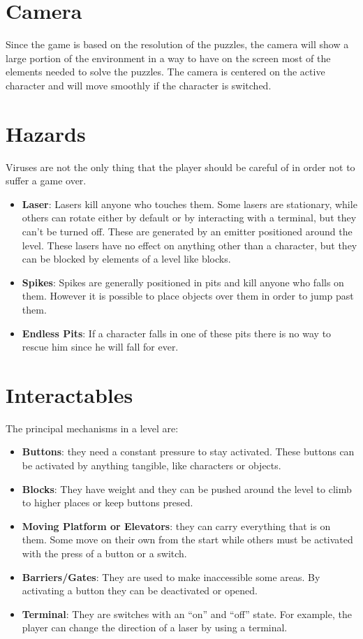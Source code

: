 \documentclass[12pt, a4paper]{report}
\begin{document}
\section*{Camera}

Since the game is based on the resolution of the puzzles, the camera will show a large portion of the environment in a way to have on the screen most of the elements needed to solve the puzzles. The camera is centered on the active character and will move smoothly if the character is switched.

\section*{Hazards}
Viruses are not the only thing that the player should be careful of in order not to suffer a game over.
\begin{itemize}
	\item \textbf{Laser}: Lasers kill anyone who touches them. Some lasers are stationary, while others can rotate either by default or by interacting with a 			terminal, but they can't be turned off. These are generated by an emitter positioned around the level. These lasers have no effect on anything other than a character, but they can be blocked by elements of a level like blocks.
	\item \textbf{Spikes}: Spikes are generally positioned in pits and kill anyone who falls on them. However it is possible to place objects over them in order to jump past them.
	\item \textbf{Endless Pits}: If a character falls in one of these pits there is no way to rescue him since he will fall for ever.
\end{itemize}

\section*{Interactables}
The principal mechanisms in a level are:
\begin{itemize}
	\item \textbf{Buttons}: they need a constant pressure to stay activated. These buttons can be activated by anything tangible, like characters or objects.
	\item \textbf{Blocks}: They have weight and they can be pushed around the level to climb to higher places or keep buttons presed.
	\item \textbf{Moving Platform or Elevators}: they can carry everything that is on them. Some move on their own from the start while others must be activated with the press of a button or a switch.
	\item \textbf{Barriers/Gates}: They are used to make inaccessible some areas. By activating a button they can be deactivated or opened.
	\item \textbf{Terminal}: They are switches with an “on” and “off” state. For example, the player can change the direction of a laser by using a terminal.
\end{itemize}
\end{document}
